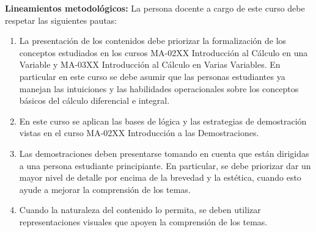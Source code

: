 \begin{refsection}
\noindent \textbf{Lineamientos metodológicos:} La persona docente a cargo de este curso debe respetar las siguientes pautas:
\begin{enumerate}
    \item La presentación de los contenidos debe priorizar la formalización de los conceptos estudiados en los cursos MA-02XX Introducción al Cálculo en una Variable y MA-03XX Introducción al Cálculo en Varias Variables. En particular en este curso se debe asumir que las personas estudiantes  ya manejan las intuiciones y las habilidades operacionales sobre los conceptos básicos del cálculo diferencial e integral.
    \item En este curso se aplican las bases de lógica y las estrategias de demostración vistas en el curso MA-02XX Introducción a las Demostraciones.
    \item Las demostraciones deben presentarse tomando en cuenta que están dirigidas a una persona estudiante principiante. En particular, se debe priorizar dar un mayor nivel de detalle por encima de la brevedad y la estética, cuando esto ayude a mejorar la comprensión de los temas.
    \item Cuando la naturaleza del contenido lo permita, se deben utilizar representaciones visuales que apoyen la comprensión de los temas.
\end{enumerate}


\end{refsection}
